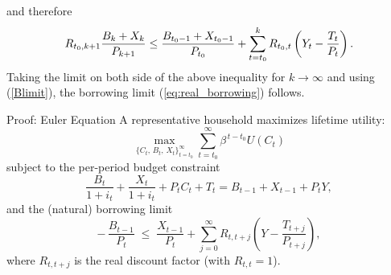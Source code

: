 \documentclass[11pt,aspectratio=169]{beamer}
\begin{document}
\begin{frame}
and therefore%
\begin{equation*}
R_{t_{0},k+1}\frac{B_{k}+X_{k}}{P_{k+1}}\leq \frac{B_{t_{0}-1}+X_{t_{0}-1}}{%
P_{t_{0}}}+\sum_{t=t_{0}}^{k}R_{t_{0},t}\left( Y_{t}-\frac{T_{t}}{P_{t}}%
\right) .
\end{equation*}%
Taking the limit on both side of the above inequality for $k\rightarrow
\infty $ and using (\ref{Blimit}), the borrowing limit (\ref{eq:real_borrowing}) follows.
\begin{center}
\hyperlink{limit}{}
\end{center}
\end{frame}

\begin{frame}[label=euler_proof]{Proof: Euler Equation}
A representative household maximizes lifetime utility:
\begin{equation} \label{eq:utility}
\max_{\{C_t,\,B_t,\,X_t\}_{t=t_0}^\infty} 
\sum_{t=t_0}^{\infty} \beta^{\,t-t_0} U(C_t)
\end{equation}
subject to the per-period budget constraint
\begin{equation} \label{eq:budget2}
\frac{B_t}{1+i_t} + \frac{X_t}{1+i_t} + P_t C_t + T_t
= B_{t-1} + X_{t-1} + P_t Y,
\end{equation}
and the (natural) borrowing limit
\begin{equation} \label{eq:borrowing2}
-\,\frac{B_{t-1}}{P_t} \;\le\; \frac{X_{t-1}}{P_t} 
+ \sum_{j=0}^{\infty} R_{t,t+j} \!\left( Y - \frac{T_{t+j}}{P_{t+j}} \right),
\end{equation}
where $R_{t,t+j}$ is the real discount factor (with $R_{t,t}=1$).
\end{frame}
\end{document}
